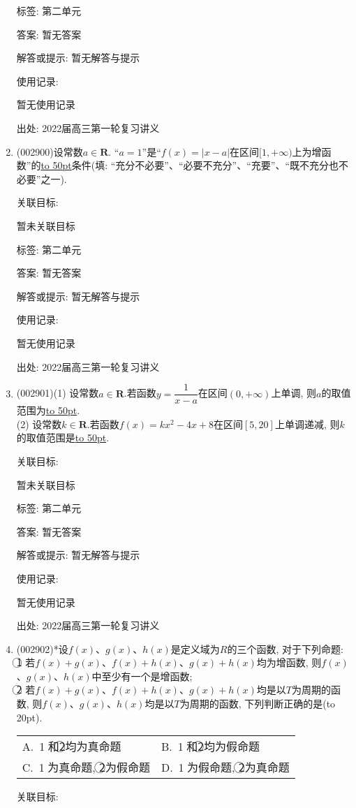 \documentclass[10pt,a4paper]{article}
\newcommand{\blank}[1]{\underline{\hbox to #1pt{}}}
\newcommand{\bracket}[1]{(\hbox to #1pt{})}
\newcommand{\twoch}[4]{\par\begin{tabular}{p{.46\textwidth}p{.46\textwidth}}
A.~#1& B.~#2\\
C.~#3& D.~#4
\end{tabular}}
\begin{document}
\begin{enumerate}[1.]
标签: 第二单元

答案: 暂无答案

解答或提示: 暂无解答与提示

使用记录:

暂无使用记录


出处: 2022届高三第一轮复习讲义
\item { (002900)}设常数$a\in \mathbf{R}$. ``$a=1$''是``$f(x)=|x-a|$在区间$[1, +\infty)$上为增函数''的\blank{50}条件(填: ``充分不必要''、``必要不充分''、``充要''、``既不充分也不必要''之一).


关联目标:

暂未关联目标



标签: 第二单元

答案: 暂无答案

解答或提示: 暂无解答与提示

使用记录:

暂无使用记录


出处: 2022届高三第一轮复习讲义
\item { (002901)}(1) 设常数$a\in \mathbf{R}$.若函数$y=\dfrac 1{x-a}$在区间$(0,+\infty)$上单调, 则$a$的取值范围为\blank{50}.\\
(2) 设常数$k\in \mathbf{R}$.若函数$f(x)=kx^2-4x+8$在区间$[5,20]$上单调递减, 则$k$的取值范围是\blank{50}.


关联目标:

暂未关联目标



标签: 第二单元

答案: 暂无答案

解答或提示: 暂无解答与提示

使用记录:

暂无使用记录


出处: 2022届高三第一轮复习讲义
\item { (002902)}*设$f(x)$、$g(x)$、$h(x)$是定义域为$R$的三个函数, 对于下列命题:\\
\textcircled{1} 若$f(x)+g(x)$、$f(x)+h(x)$、$g(x)+h(x)$均为增函数, 则$f(x)$、$g(x)$、$h(x)$中至少有一个是增函数;\\
\textcircled{2} 若$f(x)+g(x)$、$f(x)+h(x)$、$g(x)+h(x)$均是以$T$为周期的函数, 则$f(x)$、$g(x)$、$h(x)$均是以$T$为周期的函数, 下列判断正确的是\bracket{20}.
\twoch{\textcircled{1}和\textcircled{2}均为真命题}{\textcircled{1}和\textcircled{2}均为假命题}{\textcircled{1}为真命题, \textcircled{2}为假命题}{\textcircled{1}为假命题, \textcircled{2}为真命题}


关联目标:


\end{enumerate}
\end{document}
